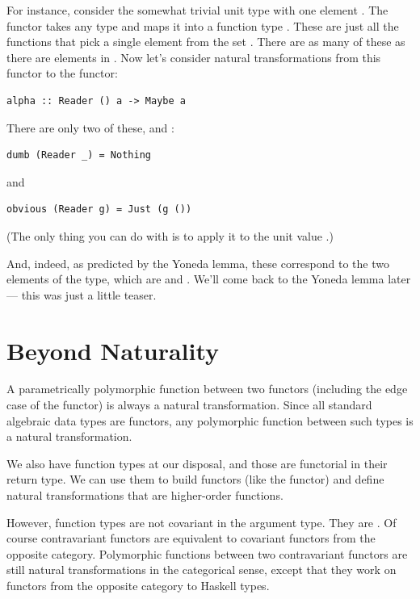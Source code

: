 For instance, consider the somewhat trivial unit type \code{()} with
one element \code{()}. The functor  takes any type
 and maps it into a function type .
These are just all the functions that pick a single element from the set
. There are as many of these as there are elements in
. Now let's consider natural transformations from this functor
to the  functor:

\begin{Verbatim}[commandchars=\\\{\}]
alpha :: Reader () a -> Maybe a
\end{Verbatim}
There are only two of these,  and :

\begin{Verbatim}[commandchars=\\\{\}]
dumb (Reader _) = Nothing
\end{Verbatim}
and

\begin{Verbatim}[commandchars=\\\{\}]
obvious (Reader g) = Just (g ())
\end{Verbatim}
(The only thing you can do with  is to apply it to the unit
value \code{()}.)

And, indeed, as predicted by the Yoneda lemma, these correspond to the
two elements of the  type, which are 
and . We'll come back to the Yoneda lemma later ---
this was just a little teaser.

\section{Beyond Naturality}\label{beyond-naturality}

A parametrically polymorphic function between two functors (including
the edge case of the  functor) is always a natural
transformation. Since all standard algebraic data types are functors,
any polymorphic function between such types is a natural transformation.

We also have function types at our disposal, and those are functorial in
their return type. We can use them to build functors (like the
 functor) and define natural transformations that are
higher-order functions.

However, function types are not covariant in the argument type. They are
. Of course contravariant functors are equivalent to
covariant functors from the opposite category. Polymorphic functions
between two contravariant functors are still natural transformations in
the categorical sense, except that they work on functors from the
opposite category to Haskell types.

